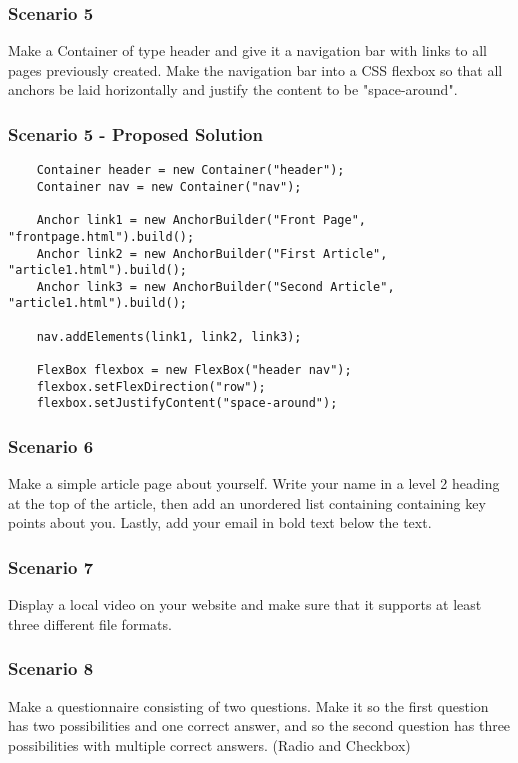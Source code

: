 \documentclass[12pt]{article}
\begin{document}
\subsubsection{Scenario 5}
Make a Container of type header and give it a navigation bar with links to all pages previously created. Make the navigation bar into a CSS flexbox so that all anchors be laid horizontally and justify the content to be "space-around".

\subsubsection{Scenario 5 - Proposed Solution}

\begin{lstlisting}
    Container header = new Container("header");
    Container nav = new Container("nav");

    Anchor link1 = new AnchorBuilder("Front Page", "frontpage.html").build();
    Anchor link2 = new AnchorBuilder("First Article", "article1.html").build();
    Anchor link3 = new AnchorBuilder("Second Article", "article1.html").build();

    nav.addElements(link1, link2, link3);

    FlexBox flexbox = new FlexBox("header nav");
    flexbox.setFlexDirection("row");
    flexbox.setJustifyContent("space-around");
\end{lstlisting}



\subsubsection{Scenario 6}
Make a simple article page about yourself. Write your name in a level 2 heading at the top of the article, then add an unordered list containing containing key points about you. Lastly, add your email in bold text below the text.

\subsubsection{Scenario 7}
Display a local video on your website and make sure that it supports at least three different file formats.

\subsubsection{Scenario 8}
Make a questionnaire consisting of two questions. Make it so the first question has two possibilities and one correct answer, and so the second question has three possibilities with multiple correct answers. (Radio and Checkbox)
\end{document}
